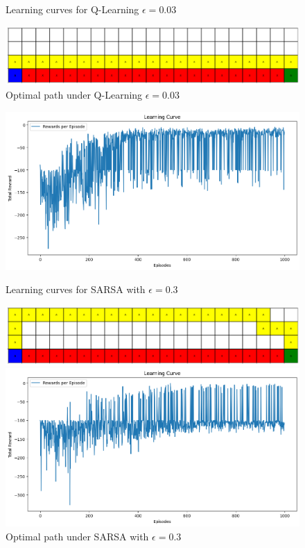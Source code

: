 \documentclass[12pt]{article}
\begin{document}
\begin{figure}[ht]
\begin{minipage}[b]{0.48\textwidth}
        \caption{\scriptsize Learning curves for Q-Learning \(\epsilon=0.03\)}
        \includegraphics[width=\textwidth]{image/R2.3.png}
        \caption{\scriptsize Optimal path under Q-Learning \(\epsilon=0.03\)}
    \end{minipage}
\end{figure}

\begin{figure}[ht]
    \centering
    \begin{minipage}[b]{0.48\textwidth}
        \centering
        \includegraphics[width=\textwidth]{image/L2.2.png}
        \caption{\scriptsize Learning curves for SARSA with \(\epsilon=0.3\)}
        \includegraphics[width=\textwidth]{image/R2.2.png}
        \caption{\scriptsize Optimal path under SARSA with \(\epsilon=0.3\)}
    \end{minipage}
    \hfill
    \begin{minipage}[b]{0.48\textwidth}
        \centering
        \includegraphics[width=\textwidth]{image/L2.4.png}

\end{minipage}
\end{figure}
\end{document}
